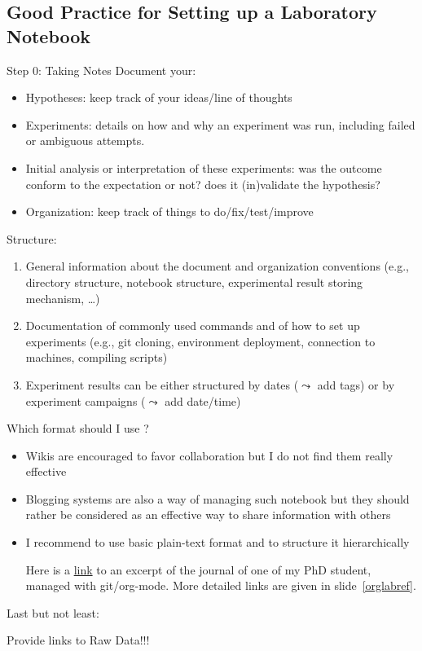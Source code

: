 \documentclass[11pt,xcolor=dvipsnames]{beamer}
\begin{document}
\subsection{Good Practice for Setting up a Laboratory Notebook}
\label{sec-3-2}
\begin{frame}[label=sec-3-2-1]{Step 0: Taking Notes}
\alert{Document} your:
\begin{itemize}
\item \alert{Hypotheses}: keep track of your ideas/line of thoughts
\item \alert{Experiments}: details on how and why an experiment was run, including
failed or ambiguous attempts.
\item \alert{Initial analysis or interpretation} of these experiments: was the
outcome conform to the expectation or not? does it (in)validate the
hypothesis?
\item \alert{Organization}: keep track of things to do/fix/test/improve
\end{itemize}

\alert{Structure}:
\begin{enumerate}
\item General information about the document and organization \alert{conventions}
(e.g., directory structure, notebook structure, experimental result
storing mechanism, \ldots{})
\item Documentation of \alert{commonly used commands} and of how to set up
experiments (e.g., git cloning, environment deployment, connection
to machines, compiling scripts)
\item Experiment results can be either structured \alert{by dates} ($\leadsto$ add
tags) or \alert{by experiment campaigns} ($\leadsto$ add date/time)
\end{enumerate}
\end{frame}
\begin{frame}[label=sec-3-2-2]{Which format should I use ?}
\begin{itemize}
\item \alert{Wikis} are encouraged to favor collaboration but I do not find them
really effective
\item \alert{Blogging} systems are also a way of managing such notebook but they
should rather be considered as an effective way to share information
with others
\item I recommend to use basic \alert{plain-text} format and to \alert{structure it
hierarchically}
\begin{center}
Here is a \alert{\href{http://starpu-simgrid.gforge.inria.fr/misc/LabBook.html\#sec-8-1}{link}} to an excerpt of the journal of one of my PhD
student, managed with git/org-mode. More detailed links are given in
slide~\ref{orglabref}.
\end{center}
\end{itemize}

Last but not least:
\begin{center}
Provide links to \alert{Raw Data}!!!
\end{center}
\end{frame}
\end{document}
